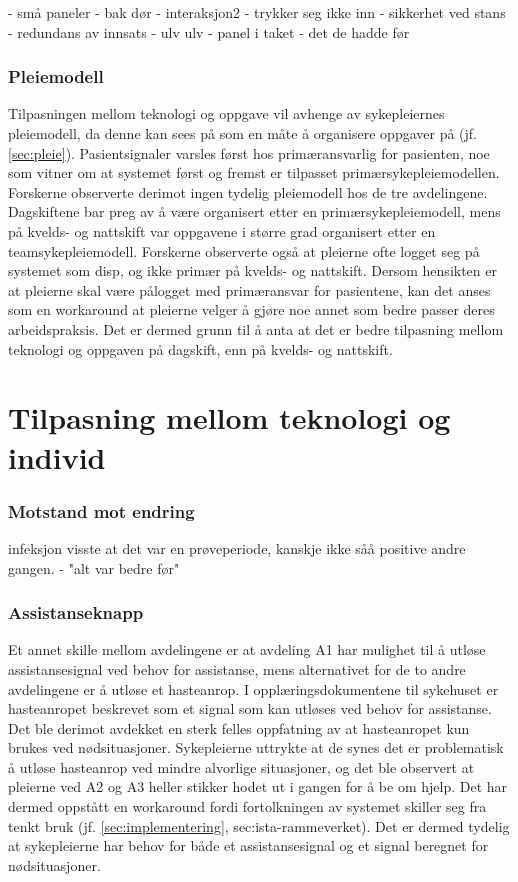- små paneler
	- bak dør - interaksjon2
- trykker seg ikke inn - sikkerhet ved stans
- redundans av innsats
- ulv ulv
- panel i taket
	- det de hadde før

\subsubsection{Pleiemodell}	
Tilpasningen mellom teknologi og oppgave vil avhenge av sykepleiernes pleiemodell, da denne kan sees på som en måte å organisere oppgaver på (jf. \ref{sec:pleie}). Pasientsignaler varsles først hos primæransvarlig for pasienten, noe som vitner om at systemet først og fremst er tilpasset primærsykepleiemodellen. Forskerne observerte derimot ingen tydelig pleiemodell hos de tre avdelingene. Dagskiftene bar preg av å være organisert etter en primærsykepleiemodell, mens på kvelds- og nattskift var oppgavene i større grad organisert etter en teamsykepleiemodell. Forskerne observerte også at pleierne ofte logget seg på systemet som disp, og ikke primær på kvelds- og nattskift. Dersom hensikten er at pleierne skal være pålogget med primæransvar for pasientene, kan det anses som en workaround at pleierne velger å gjøre noe annet som bedre passer deres arbeidspraksis. Det er dermed grunn til å anta at det er bedre tilpasning mellom teknologi og oppgaven på dagskift, enn på kvelds- og nattskift. 

		
\section{Tilpasning mellom teknologi og individ}

\subsubsection{Motstand mot endring}
	 infeksjon visste at det var en prøveperiode, kanskje ikke såå positive andre gangen.
	 	- "alt var bedre før"
	 	
\subsubsection{Assistanseknapp}
Et annet skille mellom avdelingene er at avdeling A1 har mulighet til å utløse assistansesignal ved behov for assistanse, mens alternativet for de to andre avdelingene er å utløse et hasteanrop. I opplæringsdokumentene til sykehuset er hasteanropet beskrevet som et signal som kan utløses ved behov for assistanse. Det ble derimot avdekket en sterk felles oppfatning av at hasteanropet kun brukes ved nødsituasjoner. Sykepleierne uttrykte at de synes det er problematisk å utløse hasteanrop ved mindre alvorlige situasjoner, og det ble observert at pleierne ved A2 og A3 heller stikker hodet ut i gangen for å be om hjelp. Det har dermed oppstått en workaround fordi fortolkningen av systemet skiller seg fra tenkt bruk (jf. \ref{sec:implementering}, {sec:ista-rammeverket}). Det er dermed tydelig at sykepleierne har behov for både et assistansesignal og et signal beregnet for nødsituasjoner.

